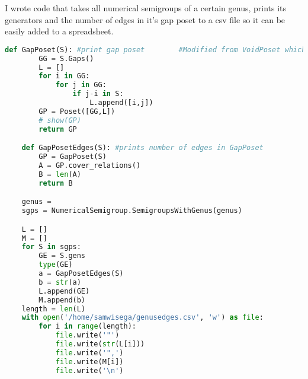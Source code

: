 I wrote code that takes all numerical semigroups of a certain genus, prints its generators and the number of edges in it's gap poset to a csv file so it can be easily added to a spreadsheet.

\begin{lstlisting}[language=python]
    def GapPoset(S): #print gap poset        #Modified from VoidPoset which was taken from Deepesh
        GG = S.Gaps()
        L = []
        for i in GG:
            for j in GG:
                if j-i in S:
                    L.append([i,j])
        GP = Poset([GG,L])
        # show(GP)
        return GP

    def GapPosetEdges(S): #prints number of edges in GapPoset 
        GP = GapPoset(S)
        A = GP.cover_relations()
        B = len(A)
        return B

    genus = 
    sgps = NumericalSemigroup.SemigroupsWithGenus(genus)

    L = []
    M = []
    for S in sgps: 
        GE = S.gens
        type(GE)
        a = GapPosetEdges(S)
        b = str(a)
        L.append(GE)
        M.append(b)
    length = len(L)
    with open('/home/samwisega/genusedges.csv', 'w') as file:
        for i in range(length):
            file.write('"')
            file.write(str(L[i]))
            file.write('",')
            file.write(M[i])
            file.write('\n')
\end{lstlisting}